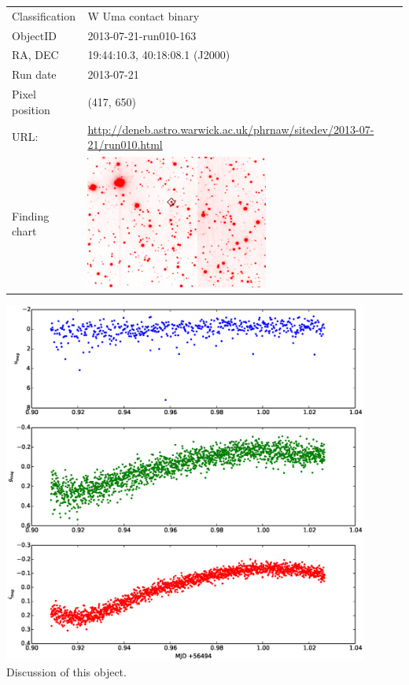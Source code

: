   \begin{tabular}{l l}
  Classification & W Uma contact binary \\
  ObjectID & 2013-07-21-run010-163 \\
  RA, DEC & 19:44:10.3, 40:18:08.1 (J2000) \\
  Run date & 2013-07-21 \\
  Pixel position & (417, 650) \\
  URL: & \small \url{http://deneb.astro.warwick.ac.uk/phrnaw/sitedev/2013-07-21/run010.html} \\
  Finding chart & \includegraphics[width=60mm]{images/2013-07-21-run010-163.png} \\
  \end{tabular}
  \includegraphics[width=120mm]{images/2013-07-21-run010-163_lightcurve.eps} \\
  Discussion of this object.


